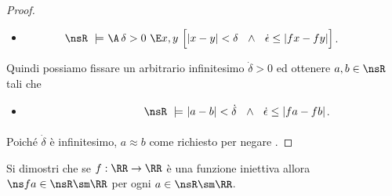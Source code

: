 \begin{proof}
\begin{itemize}
\item[]\hspace*{9ex}$\phantom{\RR\ \models\ \E\,\epsilon>0}\llap{$\nsR\ \models$}\ \A\,\delta>0\ \E x, y\ \Big[|x-y|<\delta\ \ \wedge\ \ \dot\epsilon\le|fx-fy|\Big]$.
\end{itemize}

Quindi possiamo fissare un arbitrario infinitesimo $\dot\delta>0$ ed ottenere $a,b\in\nsR$ tali che 


\begin{itemize}
\item[]\hspace*{9ex}$\phantom{\RR\ \models\ \E\,\epsilon>0\ \A\,\delta>0\ \E x, y\ \Big[}\llap{$\nsR\ \models\ $}|a-b|<\dot\delta\ \ \wedge\ \ \dot\epsilon\le|fa-fb|$.
\end{itemize}

Poich\'e $\dot\delta$ \`e infinitesimo, $a\approx b$ come richiesto per negare .
\end{proof}

\begin{comment}
La seguente proposizione \`e immediata conseguenza della proposizione~\ref{fattolimitinonstandard}

\begin{proposition}
Per ogni funzione unaria $f$ e per ogni $a$ standard, le seguenti affermazioni sono equivalenti.
\begin{itemize}
\item[a.] $f$ \`e differenziabile in $a$. Si noti questo vale in $\RR$ se e solo se valge in $\nsR$.
\item[b.] per ogni $h$ infinitesimo il rapporto

\hfil$\displaystyle\frac{f(a)-f(a+h)}{h}$

\`e finito e la sua parte standard \`e indipendente da $h$.
\end{itemize}
\end{proposition}
\end{comment}


\begin{exercise}
Si dimostri che se $f:\RR\to\RR$ \`e una funzione iniettiva allora  $\ns f a\in\nsR\sm\RR$ per ogni $a\in\nsR\sm\RR$.\QED
\end{exercise}

